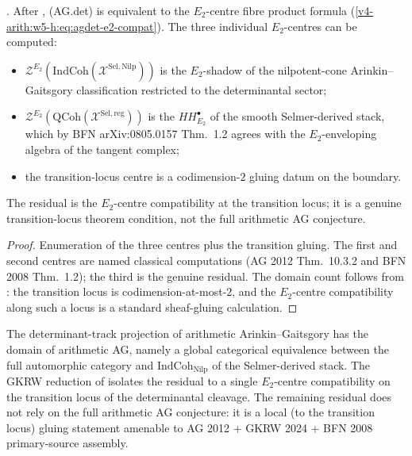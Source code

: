 \begin{corollary}
\label{v4-arith:w5-h:cor:agdet-residual}
\ClaimStatusConjectured. After
, (AG.det) is equivalent to
the \(E_{2}\)-centre fibre product formula
(\ref{v4-arith:w5-h:eq:agdet-e2-compat}). The three individual
\(E_{2}\)-centres can be computed:
\begin{itemize}
\item \(\mathcal{Z}^{E_{2}}(\mathrm{IndCoh}(\mathcal{X}^{\mathrm{Sel},\mathrm{Nilp}}))\)
is the \(E_{2}\)-shadow of the nilpotent-cone Arinkin--Gaitsgory
classification restricted to the determinantal sector;
\item \(\mathcal{Z}^{E_{2}}(\mathrm{QCoh}(\mathcal{X}^{\mathrm{Sel},\mathrm{reg}}))\)
is the \(HH^{\bullet}_{E_{2}}\) of the smooth Selmer-derived stack,
which by BFN arXiv:0805.0157 Thm.~1.2 agrees with the \(E_{2}\)-enveloping
algebra of the tangent complex;
\item the transition-locus centre is a codimension-\(2\) gluing datum on
the boundary.
\end{itemize}
The residual is the \(E_{2}\)-centre compatibility at the transition
locus; it is a genuine transition-locus theorem condition, not the
full arithmetic AG conjecture.
\end{corollary}

\begin{proof}
Enumeration of the three centres plus the transition gluing. The
first and second centres are named classical computations
(AG 2012 Thm.~10.3.2 and BFN 2008 Thm.~1.2); the third is the
genuine residual. The domain count follows from
: the
transition locus is codimension-at-most-\(2\), and the \(E_{2}\)-centre
compatibility along such a locus is a standard sheaf-gluing
calculation.
\end{proof}

\begin{remark}
\label{v4-arith:w5-h:rem:agdet-full-ag-removal}
The determinant-track projection of arithmetic Arinkin--Gaitsgory has
the domain of arithmetic AG, namely a global categorical equivalence
between the full automorphic category and
\(\mathrm{IndCoh}_{\mathrm{Nilp}}\) of the Selmer-derived stack. The
GKRW reduction of
 isolates the residual to a
single \(E_{2}\)-centre compatibility on the transition locus of the
determinantal cleavage. The remaining residual does not rely on the
full arithmetic AG conjecture:
it is a local (to the transition locus) gluing statement amenable to
AG 2012 + GKRW 2024 + BFN 2008 primary-source assembly.
\end{remark}

